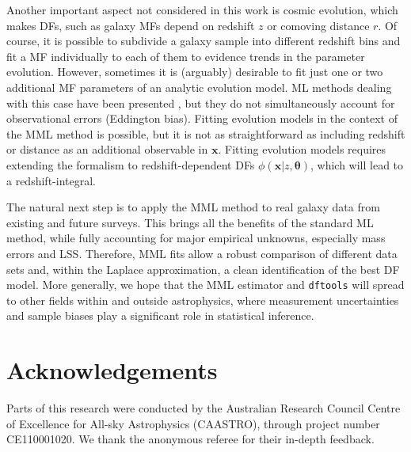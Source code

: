 \documentclass[a4paper,fleqn,usenatbib]{mnras}
\newcommand{\dftools}{\texttt{dftools}\xspace}
\newcommand{\x}{\mathbf{x}}
\newcommand{\para}{{\bm{\theta}}}
\begin{document}
Another important aspect not considered in this work is cosmic evolution, which makes DFs, such as galaxy MFs depend on redshift $z$ or comoving distance $r$. Of course, it is possible to subdivide a galaxy sample into different redshift bins and fit a MF individually to each of them to evidence trends in the parameter evolution. However, sometimes it is (arguably) desirable to fit just one or two additional MF parameters of an analytic evolution model. ML methods dealing with this case have been presented \citep{Lin1999,Loveday2012}, but they do not simultaneously account for observational errors (Eddington bias). Fitting evolution models in the context of the MML method is possible, but it is not as straightforward as including redshift or distance as an additional observable in $\x$. Fitting evolution models requires extending the formalism to redshift-dependent DFs $\phi(\x|z,\para)$, which will lead to a redshift-integral.

The natural next step is to apply the MML method to real galaxy data from existing and future surveys. This brings all the benefits of the standard ML method, while fully accounting for major empirical unknowns, especially mass errors and LSS. Therefore, MML fits allow a robust comparison of different data sets and, within the Laplace approximation, a clean identification of the best DF model. More generally, we hope that the MML estimator and \dftools will spread to other fields within and outside astrophysics, where measurement uncertainties and sample biases play a significant role in statistical inference.


\section*{Acknowledgements}
Parts of this research were conducted by the Australian Research Council Centre of Excellence for All-sky Astrophysics (CAASTRO), through project number CE110001020. We thank the anonymous referee for their in-depth feedback.


%
%
\end{document}
